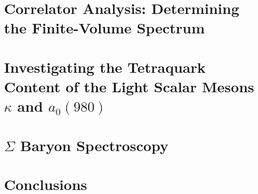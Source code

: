 \documentclass[12pt]{report}
\begin{document}
\chapter{Correlator Analysis: Determining the Finite-Volume Spectrum}\label{ch:analysis}


% 

\chapter{Investigating the Tetraquark Content of the Light Scalar Mesons $\kappa$ and $a_0(980)$}\label{ch:tetraquarks}


\chapter{$\Sigma$ Baryon Spectroscopy}\label{ch:sigmas}


\chapter{Conclusions}\label{ch:conclusions}




\end{document}
